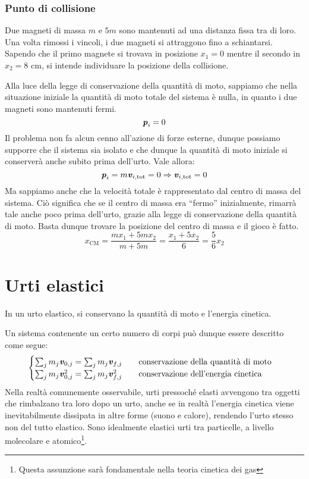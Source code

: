 \subsubsection*{Punto di collisione}
Due magneti di massa $m$ e $5m$ sono mantenuti ad una distanza fissa tra
di loro. Una volta rimossi i vincoli, i due magneti si attraggono fino a
schiantarsi. Sapendo che il primo magnete si trovava in posizione $x_1 = 0$
mentre il secondo in $x_2 = 8\text{ cm}$, si intende individuare la posizione
della collisione.

Alla luce della legge di conservazione della quantità di moto, sappiamo
che nella situazione iniziale la quantità di moto totale del sistema è
nulla, in quanto i due magneti sono mantenuti fermi.
\[ \textbf{\textit{p}}_i = 0 \]
Il problema non fa alcun cenno all'azione di forze esterne, dunque possiamo
supporre che il sistema sia isolato e che dunque la quantità di moto
iniziale si conserverà anche subito prima dell'urto. Vale allora:
\[ \textbf{\textit{p}}_i = m\textbf{\textit{v}}_{i,\text{tot}} = 0 \Rightarrow \textbf{\textit{v}}_{i,\text{tot}} = 0 \]
Ma sappiamo anche che la velocità totale è rappresentato dal centro di massa
del sistema. Ciò significa che se il centro di massa era ``fermo''
inizialmente, rimarrà tale anche poco prima dell'urto, grazie alla legge
di conservazione della quantità di moto. Basta dunque trovare la posizione
del centro di massa e il gioco è fatto.
\[ x_\text{CM} = \frac{mx_1 + 5mx_2}{m + 5m} = \frac{x_1 + 5x_2}{6} = \frac{5}{6}x_2 \]


\section{Urti elastici}
\begin{tcolorbox}[colback = yellow!30, colframe = yellow!30!black, title = {Urto}]
    In un urto elastico, si conservano la quantità di moto e l'energia cinetica.
\end{tcolorbox}
\vspace{5pt}

\noindent Un sistema contenente un certo numero di corpi può dunque essere descritto come segue:
\begin{align}
    \begin{cases}
        \sum_j m_j\textbf{\textit{v}}_{0,j} = \sum_j m_j\textbf{\textit{v}}_{f,j} \qquad \text{conservazione della quantità di moto}\\
        \sum_j m_j\textbf{\textit{v}}_{0,j}^2 = \sum_j m_j\textbf{\textit{v}}_{f,j}^2 \qquad \text{conservazione dell'energia cinetica}
    \end{cases}
\end{align}
Nella realtà comunemente osservabile, urti pressoché elasti avvengono tra
oggetti che rimbalzano tra loro dopo un urto, anche se in realtà l'energia
cinetica viene inevitabilmente dissipata in altre forme (suono e calore), rendendo
l'urto stesso non del tutto elastico. Sono idealmente elastici urti tra
particelle, a livello molecolare e atomico\footnote{Questa assunzione sarà fondamentale
nella teoria cinetica dei gas}.

